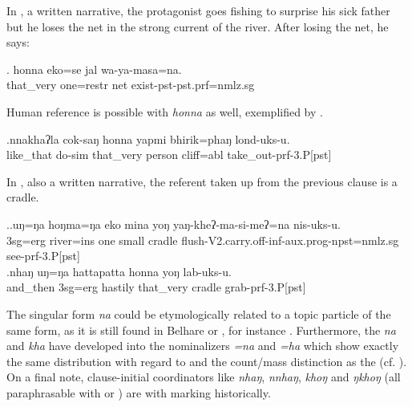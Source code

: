 In \Next, a written narrative, the protagonist goes fishing to surprise his sick father but he loses the net in the strong current of the river. After losing the net, he says:

\exg. honna           eko=se          jal wa-ya-masa=na.\\
that\_very one{\sc =restr} net exist{\sc [3sg]-pst-pst.prf=nmlz.sg}\\
  

Human reference is possible with \emph{honna} as well, exemplified by \Next.
 
\exg.nnakhaʔla   cok-saŋ       honna    yapmi  bhirik=phaŋ   lond-uks-u.\\
like\_that do{\sc -sim} that\_very  person cliff{\sc =abl} take\_out{\sc -prf-3.P[pst]}\\
 

In \Next, also a written narrative, the referent taken up from the previous clause is a cradle. 

\ex.\ag.uŋ=ŋa   hoŋma=ŋa   eko mina  yoŋ   yaŋ-kheʔ-ma-si-meʔ=na   nis-uks-u.\\
{\sc 3sg=erg} river{\sc =ins} one small cradle flush{\sc -V2.carry.off-inf-aux.prog-npst=nmlz.sg} see{\sc -prf-3.P[pst]}\\
 
\bg.nhaŋ    uŋ=ŋa   hattapatta honna        yoŋ   lab-uks-u.\\
and\_then {\sc 3sg=erg} hastily that\_very  cradle grab{\sc -prf-3.P[pst]}\\
 


The singular form  \emph{na} could be etymologically related to a topic particle of the same form, as it is still found in Belhare or , for instance \citep[559]{Bickel2003Belhare, Bickeletal2009Puma}. Furthermore, the  \emph{na} and \emph{kha} have  developed into the nominalizers \emph{=na} and \emph{=ha} which show exactly the same distribution with regard to  and the count/mass distinction as the  (cf. ). On a final note, clause-initial coordinators like \emph{nhaŋ}, \emph{nnhaŋ}, \emph{khoŋ} and \emph{ŋkhoŋ} (all paraphrasable with  or ) are  with  marking historically.



